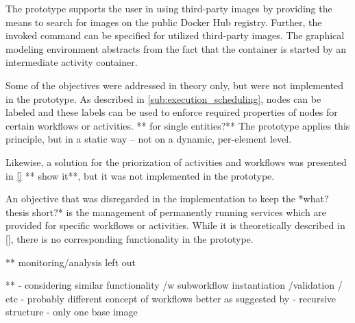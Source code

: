   The prototype supports the user in using third-party images by providing the means to search for images on the public Docker Hub registry. Further, the invoked command can be specified for utilized third-party images. The graphical modeling environment abstracts from the fact that the container is started by an intermediate activity container.


  Some of the objectives were addressed in theory only, but were not implemented in the prototype.
  As described in \ref{sub:execution_scheduling}, nodes can be labeled and these labels can be used to enforce required properties of nodes for certain workflows or activities. ** for single entities?**
  The prototype applies this principle, but in a static way -- not on a dynamic, per-element level.

  Likewise, a solution for the priorization of activities and workflows was presented in \ref{} ** show it**, but it was not implemented in the prototype.

  An objective that was disregarded in the implementation to keep the *what? thesis short?* is the management of permanently running services which are provided for specific workflows or activities. While it is theoretically described in \ref{}, there is no corresponding functionality in the prototype.

  ** monitoring/analysis left out

  **
  - considering similar functionality /w subworkflow instantiation /validation / etc
   - probably different concept of workflows better as suggested by \cite[119]{Schulze1998Services}
   - recursive structure
   - only one base image
